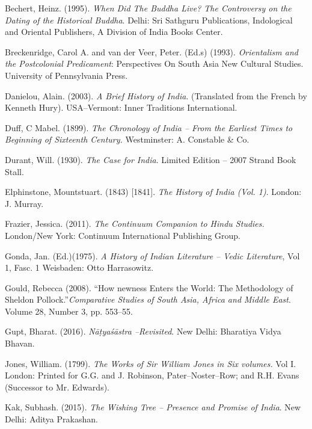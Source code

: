 \begin{thebibliography}{99}
\itemsep=1pt
 Bechert, Heinz. (1995). \textit{When Did The Buddha Live? The Controversy on the Dating of the Historical Buddha}. Delhi: Sri Sathguru Publications, Indological and Oriental Publishers, A Division of India Books Center.

  Breckenridge, Carol A. and van der Veer, Peter. (Ed.s) (1993). \textit{Orientalism and the Postcolonial Predicament}: Perspectives On South Asia New Cultural Studies. University of Pennsylvania Press.

  Danielou, Alain. (2003). \textit{A Brief History of India}. (Translated from the French by Kenneth Hury). USA–Vermont: Inner Traditions International.

  Duff, C Mabel. (1899). \textit{The Chronology of India – From the Earliest Times to Beginning of Sixteenth Century.} Westminster: A. Constable \& Co.

  Durant, Will. (1930). \textit{The Case for India}. Limited Edition – 2007 Strand Book Stall.

  Elphinstone, Mountstuart. (1843) [1841]. \textit{The History of India (Vol. 1)}. London: J. Murray.

  Frazier, Jessica. (2011). \textit{The Continuum Companion to Hindu Studies.} London/New York: Continuum International Publishing Group.

  Gonda, Jan. (Ed.)(1975). \textit{A History of Indian Literature – Vedic Literature}, Vol 1, Fasc. 1 Weisbaden: Otto Harrasowitz.

  Gould, Rebecca (2008). “How newness Enters the World: The Methodology of Sheldon Pollock.”\textit{Comparative Studies of South Asia, Africa and Middle East}. Volume 28, Number 3, pp. 553–55.

  Gupt, Bharat. (2016). \textit{Nāṭyaśāstra –Revisited}. New Delhi: Bharatiya Vidya Bhavan.

  Jones, William. (1799). \textit{ The Works of Sir William Jones in Six volumes.} Vol I. London: Printed for G.G. and J. Robinson, Pater–Noster–Row; and R.H. Evans (Successor to Mr. Edwards).

  Kak, Subhash. (2015). \textit{The Wishing Tree – Presence and Promise of India}. New Delhi: Aditya Prakashan.


\end{thebibliography}
